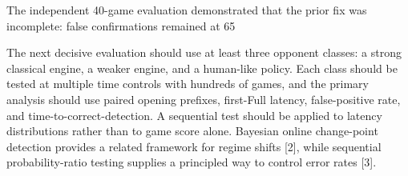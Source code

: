 \documentclass[conference]{IEEEtran}
\begin{document}
The independent 40-game evaluation demonstrated that the prior fix was incomplete: false confirmations remained at 65%

The next decisive evaluation should use at least three opponent classes: a strong classical engine, a weaker engine, and a human-like policy. Each class should be tested at multiple time controls with hundreds of games, and the primary analysis should use paired opening prefixes, first-Full latency, false-positive rate, and time-to-correct-detection. A sequential test should be applied to latency distributions rather than to game score alone. Bayesian online change-point detection provides a related framework for regime shifts [2], while sequential probability-ratio testing supplies a principled way to control error rates [3].
\end{document}
